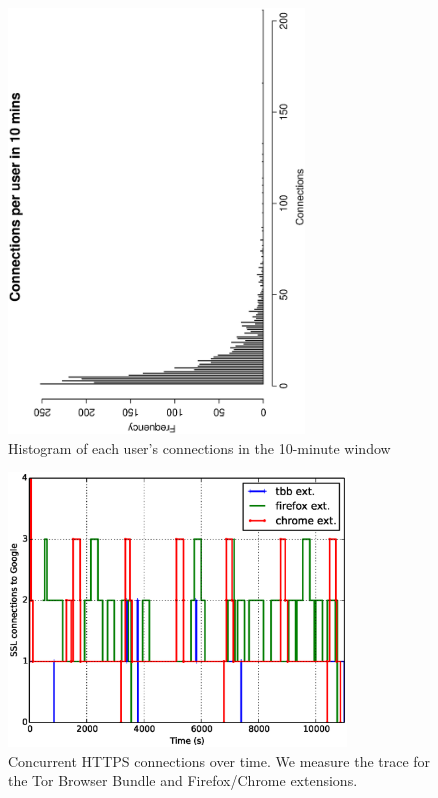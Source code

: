 \documentclass{article}
\begin{document}
\begin{figure}
\centering
\includegraphics[width=0.7\textwidth, angle=270]{figs/connections-google.eps}
\caption{Histogram of each user's connections in the 10-minute window}
\label{fig:connections}
\end{figure}
\begin{figure}
\centering
\includegraphics[width=0.8\textwidth]{figs/conns.eps}
\caption{Concurrent HTTPS connections over time. We measure the trace for the Tor Browser Bundle and Firefox/Chrome extensions.}
\label{fig:conconns}
\end{figure}
\end{document}
